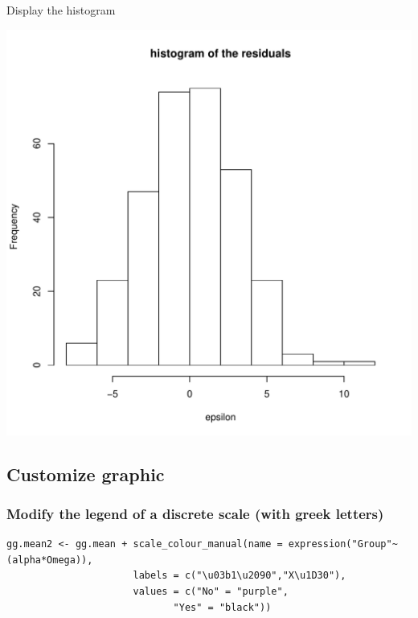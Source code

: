 \documentclass{article}
\begin{document}
Display the histogram
\begin{center}
\includegraphics[width=.9\linewidth]{./figures/fig-hist-residuals.pdf}
\end{center}

\subsection{Customize graphic}
\label{sec:org0ef6dfa}

\subsubsection{Modify the legend of a discrete scale (with greek letters)}
\label{sec:org7f71b8d}

\lstset{language=r,label= ,caption= ,captionpos=b,numbers=none}
\begin{lstlisting}
gg.mean2 <- gg.mean + scale_colour_manual(name = expression("Group"~(alpha*Omega)),
					  labels = c("\u03b1\u2090","X\u1D30"),
					  values = c("No" = "purple", 
						     "Yes" = "black"))
\end{lstlisting}
\end{document}

